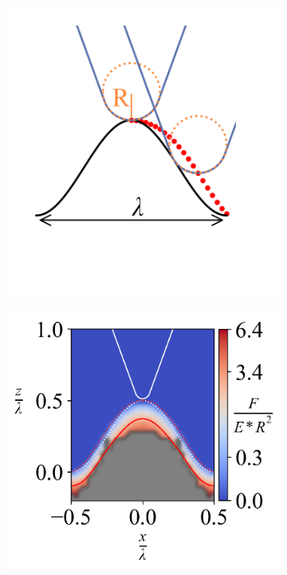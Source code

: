 \begin{figure}[H]
\centering

    \begin{subfigure}[t]{0.3\textwidth}
        \centering
        \caption{\label{fig: Wave-Setup} }
        \includegraphics[width=1\linewidth]{Figures/Wave-SetUp.png}
    \end{subfigure}
    \hfill
    \begin{subfigure}[t]{0.34\textwidth}
        \centering
        \caption{\label{fig: Wave-ContourPlot-1} }
        \includegraphics[width=1\linewidth]{Figures/Wave-ContourPlot-1.png}

\end{subfigure}
\end{figure}
